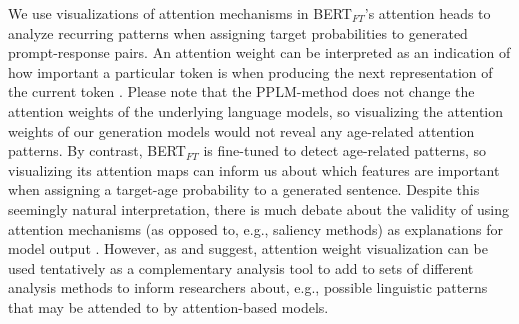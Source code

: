 
We use visualizations of attention mechanisms \citep{vig-2019-multiscale} in BERT$_{FT}$'s attention heads to analyze recurring patterns when assigning target probabilities to generated prompt-response pairs. An attention weight can be interpreted as an indication of how important a particular token is when producing the next representation of the current token \citep{DBLP:journals/corr/BahdanauCB14, clark-etal-2019-bert}. Please note that the PPLM-method does not change the attention weights of the underlying language models, so visualizing the attention weights of our generation models would not reveal any age-related attention patterns. By contrast, BERT$_{FT}$ is fine-tuned to detect age-related patterns, so visualizing its attention maps can inform us about which features are important when assigning a target-age probability to a generated sentence. Despite this seemingly natural interpretation, there is much debate about the validity of using attention mechanisms (as opposed to, e.g., saliency methods) as explanations for model output \citep{jain-wallace-2019-attention, wiegreffe-pinter-2019-attention, bastings-filippova-2020-elephant}. However, as \cite{vig-2019-multiscale} and \cite{clark-etal-2019-bert} suggest, attention weight visualization can be used tentatively as a complementary analysis tool to add to sets of different analysis methods to inform researchers about, e.g., possible linguistic patterns that may be attended to by attention-based models.

